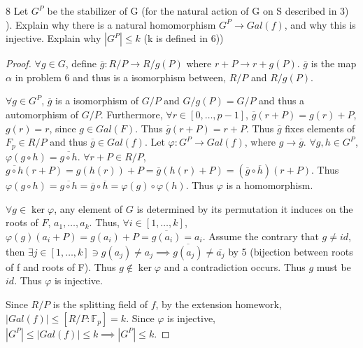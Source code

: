 \documentclass{article}
\newcommand{\F}{\mathbb{F}}
\begin{document}
\begin{PROB}{8}\label{Problem 8.}
    Let $G^P$ be the stabilizer of G (for the natural action of G on S described in 3) ). Explain why there is a natural homomorphism $G^P \to Gal(f)$, and why this is injective.  Explain why $|G^P| \leq k$ (k is defined in 6))
\end{PROB}
\begin{proof}
    $\forall g \in G$, define $\overline{g} : R / P \to R / g(P)$ where $r + P \to r + g(P)$. $\overline{g}$ is the map $\alpha$ in problem 6 and thus is a isomorphism between, $R / P$ and $R / g(P)$.    

    $\forall g \in G^P$, $\overline{g}$ is a isomorphism of $G / P$ and $G / g(P) = G / P$ and thus a automorphism of $G / P$. Furthermore, $\forall r \in [0, \dots, p - 1]$, $\overline{g}(r + P) = g(r) + P$, $g(r) = r$, since $g \in Gal(F)$. Thus $\overline{g}(r + P) = r + P$. Thus $\overline{g}$ fixes elements of $F_p \in R / P$ and thus $\overline{g} \in Gal(f)$.
    Let $\varphi: G^P \to Gal(f)$, where $g \to \overline{g}$. $\forall g, h \in G^P$, $\varphi(g \circ h) = \overline{g \circ h}$. $\forall r + P \in R / P$, $\overline{g \circ h}(r + P) = g(h(r)) + P = \overline{g}(h(r) + P) = (\overline{g} \circ \overline{h})(r + P)$. Thus $\varphi(g \circ h) = \overline{g \circ h} = \overline{g} \circ \overline{h}= \varphi(g) \circ \varphi(h)$. Thus $\varphi$ is a homomorphism. 
    
    $\forall g \in \ker \varphi$, any element of $G$ is determined by its permutation it induces on the roots of $F$, $a_1, \dots, a_k$. Thus, $\forall i \in [1, \dots, k]$, $\varphi(g)(a_i + P) = g(a_i) + P = \overline{g(a_i)} = a_i$. Assume the contrary that $g \neq id$, then $\exists j \in [1, \dots, k] \ni g(a_j) \neq a_j \implies \overline{g(a_j)} \neq \overline{a_j}$ by 5 (bijection between roots of f and roots of F). Thus $g \not \in \ker \varphi$ and a contradiction occurs. Thus $g$ must be $id$. Thus $\varphi$ is injective.
    
    Since $R / P$ is the splitting field of $f$, by the extension homework, $|Gal(f)| \leq [R / P: \F_p] = k$. Since $\varphi$ is injective, $|G^P| \leq |Gal(f)| \leq k \implies |G^P| \leq k$.      
\end{proof}

\bigskip
\end{document}
